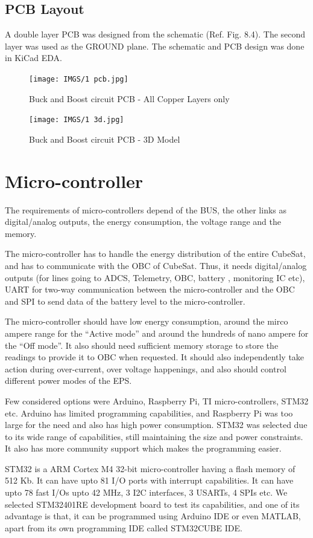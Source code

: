 \subsection{PCB Layout}
 A double layer PCB was designed from the schematic (Ref. Fig. 8.4). The second layer was used as the GROUND plane. The schematic and PCB design was done in KiCad EDA. 
 
  \begin{figure}[h]
 	\centering
 	\texttt{[image: IMGS/1 pcb.jpg]}
 	\caption{\centering Buck and Boost circuit PCB - All Copper Layers only}
 	\label{fig:bubopcb}
 \end{figure}
 
   \begin{figure}[H]
 	\centering
 	\texttt{[image: IMGS/1 3d.jpg]}
 	\caption{\centering Buck and Boost circuit PCB - 3D Model}
 	\label{fig:bubopcb3d}
 \end{figure}
\pagebreak

 
 \section{Micro-controller}
 The requirements of micro-controllers depend of the BUS, the other links as digital/analog outputs, the energy consumption, the voltage range and the memory.
 \par
 The micro-controller has to handle the energy distribution of the entire CubeSat, and has to communicate with the OBC of CubeSat. Thus, it needs digital/analog outputs (for lines going to ADCS, Telemetry, OBC, battery , monitoring IC etc), UART for two-way communication between the micro-controller and the OBC and SPI to  send data of the battery level to the micro-controller.
 \par
 The micro-controller should have low energy consumption, around the mirco ampere range for the “Active mode” and around the hundreds of nano ampere for the “Off mode”. It also should need sufficient memory storage to store the readings to provide it to OBC when requested. It should also independently take action during over-current, over voltage happenings, and also should control different power modes of the EPS.
 \par
 Few considered options were Arduino, Raspberry Pi, TI micro-controllers, STM32 etc. Arduino has limited programming capabilities, and Raspberry Pi was too large for the need and also has high power consumption. STM32 was selected due to its wide range of capabilities, still maintaining the size and power constraints. It also has more community support which makes the programming easier.
 \par
 STM32 is a ARM Cortex M4 32-bit micro-controller having a flash memory of 512 Kb. It can have upto 81 I/O ports with interrupt capabilities. It can have upto 78 fast I/Os upto 42 MHz, 3 I2C interfaces, 3 USARTs, 4 SPIs etc. We selected STM32401RE development board to test its capabilities, and one of its advantage is that, it can be programmed using Arduino IDE or even MATLAB, apart from its own programming IDE called STM32CUBE IDE.
 
